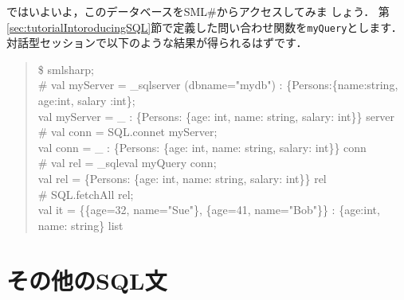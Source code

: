 \documentclass{jbook}
\newcommand{\smlsharp}{SML\#}
\newenvironment{program}{\begin{tt}\begin{quote}}{\end{quote}\end{tt}}
\begin{document}
	ではいよいよ，このデータベースを\smlsharp{}からアクセスしてみま
しょう．
	第\ref{sec:tutorialIntoroducingSQL}節で定義した問い合わせ関数を{\tt myQuery}とします．
	対話型セッションで以下のような結果が得られるはずです．
\begin{program}
\$ smlsharp;\\
\# val myServer = \_sqlserver (dbname="mydb") : \{Persons:\{name:string, age:int, salary :int\};\\
val myServer = \_ : \{Persons: \{age: int, name: string, salary: int\}\} server\\
\# val conn = SQL.connet myServer;\\
val conn = \_ : \{Persons: \{age: int, name: string, salary: int\}\} conn\\
\# val rel = \_sqleval myQuery conn;\\
val rel = \{Persons: \{age: int, name: string, salary: int\}\} rel\\
\# SQL.fetchAll rel;\\
val it = \{\{age=32, name="Sue"\}, \{age=41, name="Bob"\}\} : \{age:int, name: string\} list
\end{program}

\section{その他のSQL文}
\label{sec:tutorialOtherSQLElement}
\end{document}
